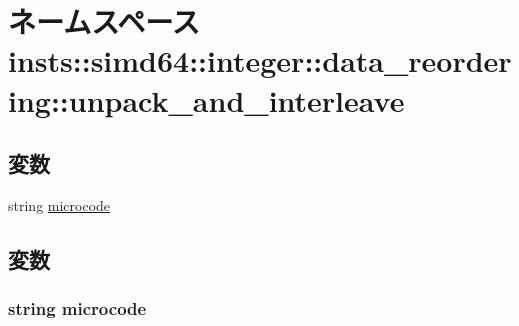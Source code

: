\hypertarget{namespaceinsts_1_1simd64_1_1integer_1_1data__reordering_1_1unpack__and__interleave}{
\section{ネームスペース insts::simd64::integer::data\_\-reordering::unpack\_\-and\_\-interleave}
\label{namespaceinsts_1_1simd64_1_1integer_1_1data__reordering_1_1unpack__and__interleave}
}
\subsection*{変数}
\begin{DoxyCompactItemize}
\item 
string \hyperlink{namespaceinsts_1_1simd64_1_1integer_1_1data__reordering_1_1unpack__and__interleave_a770f11a173e99389a8802f0107ed8f52}{microcode}
\end{DoxyCompactItemize}


\subsection{変数}
\hypertarget{namespaceinsts_1_1simd64_1_1integer_1_1data__reordering_1_1unpack__and__interleave_a770f11a173e99389a8802f0107ed8f52}{
\subsubsection[{microcode}]{\setlength{\rightskip}{0pt plus 5cm}string {\bf microcode}}}
\label{namespaceinsts_1_1simd64_1_1integer_1_1data__reordering_1_1unpack__and__interleave_a770f11a173e99389a8802f0107ed8f52}
